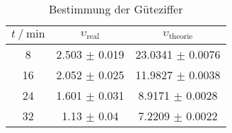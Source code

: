 \begin{table}
        \centering
        \label{tab:gueteziffer}
        \begin{tabular}{c c c}
        \toprule
        $t \mathbin{/} \si{\minute} $ & $\upsilon_\text{real}$ & $\upsilon_\text{theorie}$ \\
        \midrule
        8  & 2.503 $\pm$ 0.019 & 23.0341 $\pm$ 0.0076 \\
        16 & 2.052 $\pm$ 0.025 & 11.9827 $\pm$ 0.0038 \\
        24 & 1.601 $\pm$ 0.031 & 8.9171  $\pm$ 0.0028 \\
        32 & 1.13 $\pm$ 0.04 & 7.2209  $\pm$ 0.0022 \\
        \bottomrule
        \end{tabular}
        \caption{Bestimmung der Güteziffer}
        \end{table}